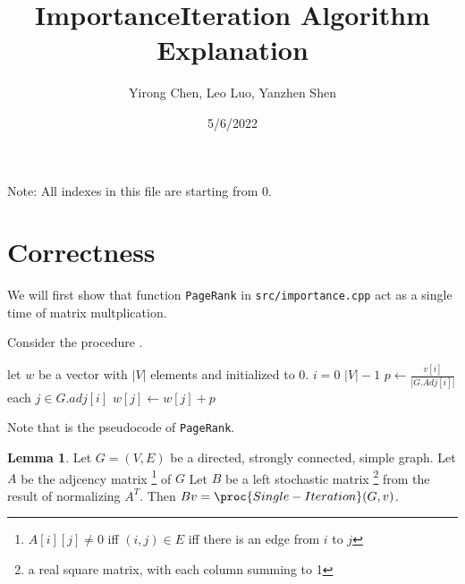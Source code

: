 \documentclass[UTF8]{ctexart}
\title{ImportanceIteration Algorithm Explanation}
\author{Yirong Chen, Leo Luo, Yanzhen Shen}
\date{5/6/2022}
\theoremstyle{definition}
\newtheorem{lemma}[theorem]{Lemma}
\begin{document}
\maketitle

Note: All indexes in this file are starting from $0$. 

\section*{Correctness}

We will first show that function \texttt{PageRank} in \texttt{src/importance.cpp} 
act as a single time of matrix multplication. 

Consider the procedure .
\begin{codebox}
    \li let $w$ be a vector with $| V |$ elements and initialized to $0$. 
    \li \For $i = 0$ \To $| V | - 1$ \Do
    \li     $p \gets \frac{v[i]}{| G.Adj[i] |}$
    \li     \For each $j \in G.adj[i]$ \Do
    \li         $w[j] \gets w[j] + p$
            \End
        \End
\end{codebox}
Note that  is the pseudocode of \texttt{PageRank}. 

\begin{lemma} \label{lemma:single_it}
    Let $G = (V, E)$ be a directed, strongly connected, simple graph. 
    Let $A$ be the adjcency matrix 
    \footnote{$A[i][j] \neq 0$ iff $(i, j) \in E$ iff there is an edge from $i$ to $j$} 
    of $G$ 
    Let $B$ be a left stochastic matrix 
    \footnote{a real square matrix, with each column summing to 1} 
    from the result of normalizing $A^T$. 
    Then $B v = \proc{Single-Iteration}(G, v)$. 
\end{lemma}
\end{document}
